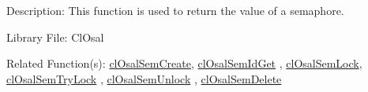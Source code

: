 \begin{Desc}
\item[Description:]This function is used to return the value of a semaphore.\end{Desc}
\begin{Desc}
\item[Library File:]Cl\-Osal\end{Desc}
\begin{Desc}
\item[Related Function(s):]\hyperlink{pageosal132}{cl\-Osal\-Sem\-Create}, \hyperlink{pageosal133}{cl\-Osal\-Sem\-Id\-Get} , 
\hyperlink{pageosal134}{cl\-Osal\-Sem\-Lock}, \hyperlink{pageosal135}{cl\-Osal\-Sem\-Try\-Lock} , 
\hyperlink{pageosal136}{cl\-Osal\-Sem\-Unlock} , \hyperlink{pageosal138}{cl\-Osal\-Sem\-Delete} \end{Desc}

\newpage
